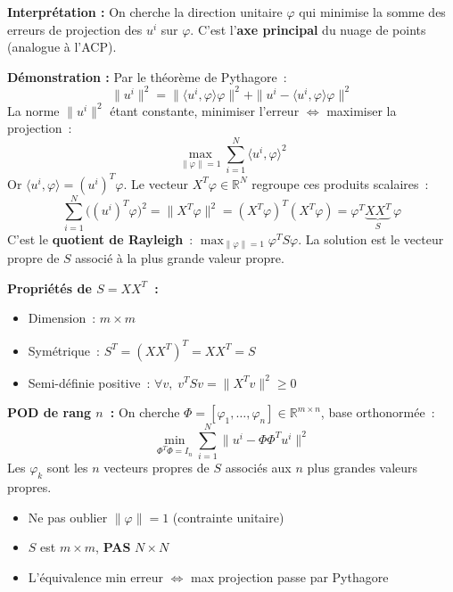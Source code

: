 \documentclass[11pt,a4paper]{article}
\begin{document}
\begin{formulabox}
\textbf{Interpr\'etation :} On cherche la direction unitaire $\varphi$ qui minimise la somme des erreurs de projection des $u^i$ sur $\varphi$. C'est l'\textbf{axe principal} du nuage de points (analogue \`a l'ACP).

\medskip
\textbf{D\'emonstration :} Par le th\'eor\`eme de Pythagore~:
\[
\|u^i\|^2 = \|\langle u^i,\varphi\rangle\varphi\|^2 + \|u^i - \langle u^i,\varphi\rangle\varphi\|^2
\]
La norme $\|u^i\|^2$ \'etant constante, minimiser l'erreur $\Leftrightarrow$ maximiser la projection~:
\[
\max_{\|\varphi\|=1} \sum_{i=1}^{N} \langle u^i,\varphi\rangle^2
\]
Or $\langle u^i,\varphi\rangle = (u^i)^T\varphi$. Le vecteur $X^T\varphi \in \mathbb{R}^N$ regroupe ces produits scalaires~:
\[
\sum_{i=1}^{N} \big((u^i)^T\varphi\big)^2 = \|X^T\varphi\|^2 = (X^T\varphi)^T(X^T\varphi) = \varphi^T \underbrace{XX^T}_{S}\, \varphi
\]
C'est le \textbf{quotient de Rayleigh}~: $\displaystyle\max_{\|\varphi\|=1} \varphi^T S\varphi$. La solution est le vecteur propre de $S$ associ\'e \`a la plus grande valeur propre.

\medskip
\textbf{Propri\'et\'es de $S = XX^T$~:}
\begin{itemize}[nosep]
\item Dimension~: $m \times m$
\item Sym\'etrique~: $S^T = (XX^T)^T = XX^T = S$
\item Semi-d\'efinie positive~: $\forall v,\; v^TSv = \|X^Tv\|^2 \geq 0$
\end{itemize}

\medskip
\textbf{POD de rang $n$~:} On cherche $\Phi = [\varphi_1,\ldots,\varphi_n] \in \mathbb{R}^{m\times n}$, base orthonorm\'ee~:
\[
\boxed{\min_{\Phi^T\Phi = I_n} \sum_{i=1}^{N} \|u^i - \Phi\Phi^T u^i\|^2}
\]
Les $\varphi_k$ sont les $n$ vecteurs propres de $S$ associ\'es aux $n$ plus grandes valeurs propres.
\end{formulabox}

\begin{warningbox}[Pi\`eges Q1]
\begin{itemize}[nosep]
\item Ne pas oublier $\|\varphi\|=1$ (contrainte unitaire)
\item $S$ est $m\times m$, \textbf{PAS} $N\times N$
\item L'\'equivalence min erreur $\Leftrightarrow$ max projection passe par Pythagore
\end{itemize}
\end{warningbox}
\end{document}

